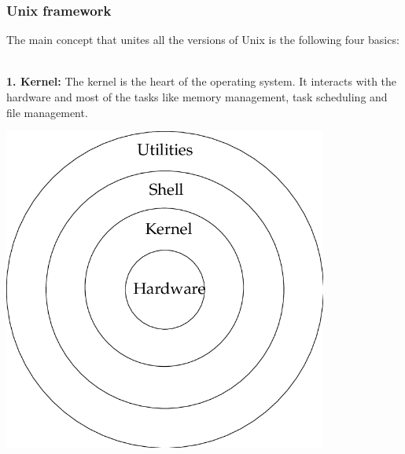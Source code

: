 \documentclass{if-beamer}
\begin{document}
\begin{frame}
\frametitle{Unix framework}
The main concept that unites all the versions of Unix is the following four basics: \\~\

\begin{minipage}{.45\textwidth}
\textbf{1. Kernel:} The kernel is the heart of the operating system. It interacts with the hardware and most of the tasks like memory management, task scheduling and file management. 
\end{minipage} 
\begin{minipage}{.5\textwidth}
	
	\includegraphics[width=0.8\textwidth]{figures/unix.png}
\end{minipage} 
\end{frame}
\end{document}

